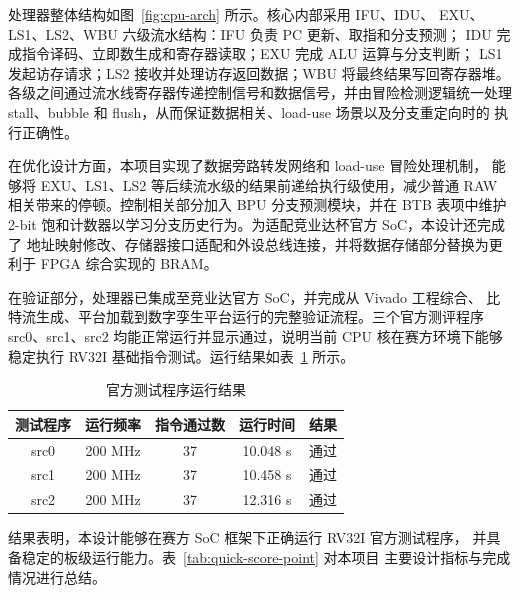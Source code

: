 \documentclass[UTF8,a4paper,zihao=-4]{ctexart}
\renewcommand{\arraystretch}{1.08}
\begin{document}
处理器整体结构如图~\ref{fig:cpu-arch} 所示。核心内部采用 IFU、IDU、
EXU、LS1、LS2、WBU 六级流水结构：IFU 负责 PC 更新、取指和分支预测；
IDU 完成指令译码、立即数生成和寄存器读取；EXU 完成 ALU 运算与分支判断；
LS1 发起访存请求；LS2 接收并处理访存返回数据；WBU 将最终结果写回寄存器堆。
各级之间通过流水线寄存器传递控制信号和数据信号，并由冒险检测逻辑统一处理
stall、bubble 和 flush，从而保证数据相关、load-use 场景以及分支重定向时的
执行正确性。

在优化设计方面，本项目实现了数据旁路转发网络和 load-use 冒险处理机制，
能够将 EXU、LS1、LS2 等后续流水级的结果前递给执行级使用，减少普通 RAW
相关带来的停顿。控制相关部分加入 BPU 分支预测模块，并在 BTB 表项中维护
2-bit 饱和计数器以学习分支历史行为。为适配竞业达杯官方 SoC，本设计还完成了
地址映射修改、存储器接口适配和外设总线连接，并将数据存储部分替换为更利于
FPGA 综合实现的 BRAM。

在验证部分，处理器已集成至竞业达官方 SoC，并完成从 Vivado 工程综合、
比特流生成、平台加载到数字孪生平台运行的完整验证流程。三个官方测评程序
src0、src1、src2 均能正常运行并显示通过，说明当前 CPU 核在赛方环境下能够
稳定执行 RV32I 基础指令测试。运行结果如表~\ref{tab:quick-test-result} 所示。

\begin{table}[htbp]
    \centering
    \caption{官方测试程序运行结果}
    \label{tab:quick-test-result}
    {
    \setlength{\tabcolsep}{8pt}
    \renewcommand{\arraystretch}{1.38}
    \begin{tabular}{|c|c|c|c|c|}
        \hline
        测试程序 & 运行频率 & 指令通过数 & 运行时间 & 结果 \\
        \hline
        src0 & 200 MHz & 37 & 10.048 s & 通过 \\
        \hline
        src1 & 200 MHz & 37 & 10.458 s & 通过 \\
        \hline
        src2 & 200 MHz & 37 & 12.316 s & 通过 \\
        \hline
    \end{tabular}
    }
\end{table}

结果表明，本设计能够在赛方 SoC 框架下正确运行 RV32I 官方测试程序，
并具备稳定的板级运行能力。表~\ref{tab:quick-score-point} 对本项目
主要设计指标与完成情况进行总结。
\end{document}
